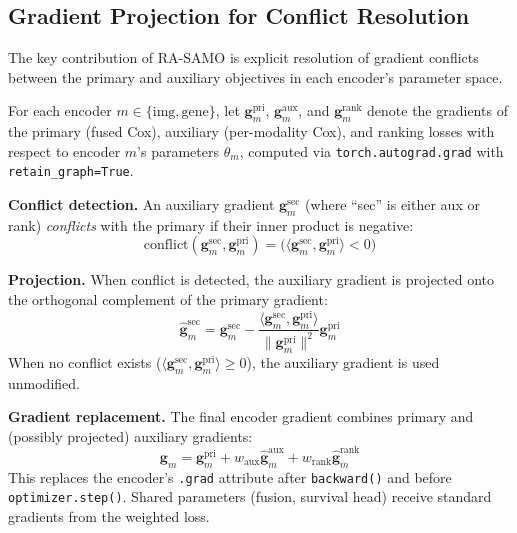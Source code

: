 \documentclass[10pt,twocolumn]{article}
\begin{document}
\subsection{Gradient Projection for Conflict Resolution}
\label{sec:projection}

The key contribution of RA-SAMO is explicit resolution of gradient
conflicts between the primary and auxiliary objectives in each
encoder's parameter space.

For each encoder $m \in \{\text{img}, \text{gene}\}$, let
$\mathbf{g}_m^{\text{pri}}$, $\mathbf{g}_m^{\text{aux}}$, and
$\mathbf{g}_m^{\text{rank}}$ denote the gradients of the primary
(fused Cox), auxiliary (per-modality Cox), and ranking losses with
respect to encoder $m$'s parameters $\theta_m$, computed via
\texttt{torch.autograd.grad} with \texttt{retain\_graph=True}.

\textbf{Conflict detection.} An auxiliary gradient
$\mathbf{g}_m^{\text{sec}}$ (where ``sec'' is either aux or rank)
\textit{conflicts} with the primary if their inner product is negative:
\begin{equation}
\text{conflict}(\mathbf{g}_m^{\text{sec}}, \mathbf{g}_m^{\text{pri}}) =
\bigl(\langle \mathbf{g}_m^{\text{sec}}, \mathbf{g}_m^{\text{pri}} \rangle < 0\bigr)
\label{eq:conflict}
\end{equation}

\textbf{Projection.} When conflict is detected, the auxiliary gradient
is projected onto the orthogonal complement of the primary gradient:
\begin{equation}
\hat{\mathbf{g}}_m^{\text{sec}} = \mathbf{g}_m^{\text{sec}} -
\frac{\langle \mathbf{g}_m^{\text{sec}}, \mathbf{g}_m^{\text{pri}} \rangle}
{\|\mathbf{g}_m^{\text{pri}}\|^2}
\mathbf{g}_m^{\text{pri}}
\label{eq:project}
\end{equation}
When no conflict exists ($\langle \mathbf{g}_m^{\text{sec}},
\mathbf{g}_m^{\text{pri}} \rangle \geq 0$), the auxiliary gradient is
used unmodified.

\textbf{Gradient replacement.} The final encoder gradient combines
primary and (possibly projected) auxiliary gradients:
\begin{equation}
\mathbf{g}_m = \mathbf{g}_m^{\text{pri}} +
w_{\text{aux}} \hat{\mathbf{g}}_m^{\text{aux}} +
w_{\text{rank}} \hat{\mathbf{g}}_m^{\text{rank}}
\label{eq:combined}
\end{equation}
This replaces the encoder's \texttt{.grad} attribute after
\texttt{backward()} and before \texttt{optimizer.step()}.
Shared parameters (fusion, survival head) receive standard
gradients from the weighted loss.
\end{document}
